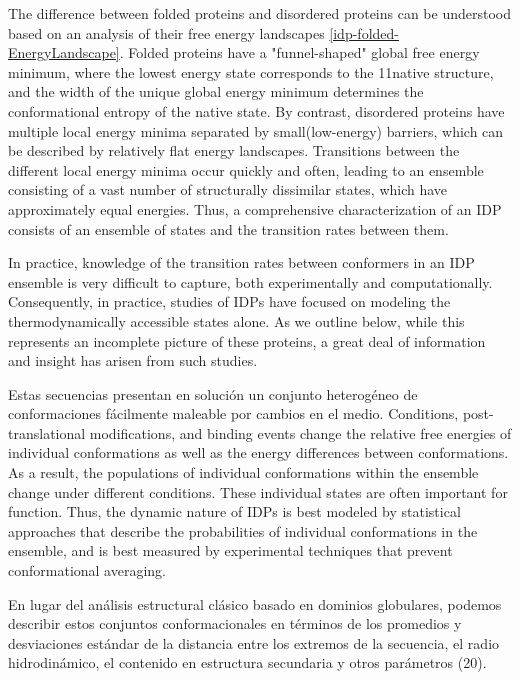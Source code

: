 The difference between folded proteins and disordered proteins can be understood based on an analysis of their free energy landscapes \ref{idp-folded-EnergyLandscape}.
Folded proteins have a "funnel-shaped" global free energy minimum, where the lowest energy state corresponds to the 11native structure, and the width of the unique global energy minimum
determines the conformational entropy of the native state.
By contrast, disordered proteins have multiple local energy minima separated by small(low-energy) barriers, which can be described by relatively flat energy landscapes.
Transitions between the different local energy minima occur quickly and often, leading to an ensemble consisting of a vast number of structurally dissimilar states, which have approximately equal energies. 
Thus, a comprehensive characterization of an IDP consists of an ensemble of states and the transition rates between them.

In practice, knowledge of the transition rates between conformers in an IDP ensemble is very difficult to capture, both experimentally and computationally. 
Consequently, in practice, studies of IDPs have focused on modeling the thermodynamically accessible states alone. As we outline below, while this represents an incomplete picture of these
proteins, a great deal of information and insight has arisen from such studies.


Estas secuencias presentan en solución un conjunto heterogéneo de conformaciones fácilmente maleable por cambios en el medio. 
Conditions, post-translational modifications, and binding events change the relative free energies of individual conformations as well as the energy differences between conformations.
As a result, the populations of individual conformations within the ensemble change under different conditions. 
These individual states are often important for function. Thus, the dynamic nature of IDPs is best modeled by statistical approaches that describe the
probabilities of individual conformations in the ensemble, and is best measured by experimental techniques that prevent conformational averaging.

En lugar del análisis estructural clásico basado en dominios globulares, podemos describir estos conjuntos conformacionales en términos de los promedios y desviaciones estándar de la distancia entre los extremos de la secuencia, el radio hidrodinámico, el contenido en estructura secundaria y otros parámetros (20).


